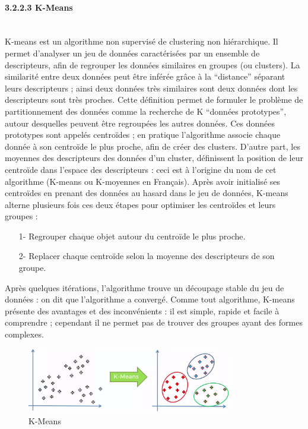 \paragraph{{\large 3.2.2.3 K-Means}\\\\}
K-means est un algorithme non supervisé de clustering non hiérarchique. Il permet d’analyser un jeu de données caractérisées par un ensemble de descripteurs, afin de regrouper les données similaires en groupes (ou clusters). La similarité entre deux données peut être inférée grâce à la “distance” séparant leurs descripteurs ; ainsi deux données très similaires sont deux données dont les descripteurs sont très proches. Cette définition permet de formuler le problème de partitionnement des données comme la recherche de K “données prototypes”, autour desquelles peuvent être regroupées les autres données. Ces données prototypes sont appelés centroïdes ; en pratique l’algorithme associe chaque donnée à son centroïde le plus proche, afin de créer des clusters. D’autre part, les moyennes des descripteurs des données d’un cluster, définissent la position de leur centroïde dans l’espace des descripteurs : ceci est à l’origine du nom de cet algorithme (K-means ou K-moyennes en Français). Après avoir initialisé ses centroïdes en prenant des données au hasard dans le jeu de données, K-means alterne plusieurs fois ces deux étapes pour optimiser les centroïdes et leurs groupes :\\
\begin{itemize}
\item[1-]Regrouper chaque objet autour du centroïde le plus proche.
\item[2-]Replacer chaque centroïde selon la moyenne des descripteurs de son groupe.\\
\end{itemize}

Après quelques itérations, l’algorithme trouve un découpage stable du jeu de données : on dit que l’algorithme a convergé. Comme tout algorithme, K-means présente des avantages et des inconvénients : il est simple, rapide et facile à comprendre ; cependant il ne permet pas de trouver des groupes ayant des formes complexes.

\begin{figure}[h]
\centering
\includegraphics[width=0.8\textwidth]{Figures/K-means}
\decoRule
\caption{K-Means}
\label{fig:K-means}
\end{figure}

